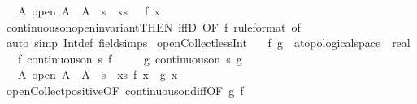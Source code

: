 \begin{isabellebody}
\ \ \ {\isachardoublequoteopen}{\isasymexists}A{\isachardot}{\kern0pt}\ open\ A\ {\isasymand}\ A\ {\isasyminter}\ s\ {\isacharequal}{\kern0pt}\ {\isacharbraceleft}{\kern0pt}x{\isasymin}s{\isachardot}{\kern0pt}\ {}\ {\isacharless}{\kern0pt}\ f\ x{\isacharbraceright}{\kern0pt}{\isachardoublequoteclose}\isanewline
%
\isadelimproof
\ \ %
\endisadelimproof
%
\isatagproof
{}\isamarkupfalse%
\ continuous{\isacharunderscore}{\kern0pt}on{\isacharunderscore}{\kern0pt}open{\isacharunderscore}{\kern0pt}invariant{\isacharbrackleft}{\kern0pt}THEN\ iffD{}{\isacharcomma}{\kern0pt}\ OF\ f{\isacharcomma}{\kern0pt}\ rule{\isacharunderscore}{\kern0pt}format{\isacharcomma}{\kern0pt}\ of\ {\isachardoublequoteopen}{\isacharbraceleft}{\kern0pt}{}\ {\isacharless}{\kern0pt}{\isachardot}{\kern0pt}{\isachardot}{\kern0pt}{\isacharbraceright}{\kern0pt}{\isachardoublequoteclose}{\isacharbrackright}{\kern0pt}\isanewline
\ \ \isamarkupfalse%
\ {\isacharparenleft}{\kern0pt}auto\ simp{\isacharcolon}{\kern0pt}\ Int{\isacharunderscore}{\kern0pt}def\ field{\isacharunderscore}{\kern0pt}simps{\isacharparenright}{\kern0pt}%
\endisatagproof
{\isafoldproof}%
%
\isadelimproof
\isanewline
%
\endisadelimproof
\isanewline
{}\isamarkupfalse%
\ open{\isacharunderscore}{\kern0pt}Collect{\isacharunderscore}{\kern0pt}less{\isacharunderscore}{\kern0pt}Int{\isacharcolon}{\kern0pt}\isanewline
\ \ \ f\ g\ {\isacharcolon}{\kern0pt}{\isacharcolon}{\kern0pt}\ {\isachardoublequoteopen}{\isacharprime}{\kern0pt}a{\isacharcolon}{\kern0pt}{\isacharcolon}{\kern0pt}topological{\isacharunderscore}{\kern0pt}space\ {\isasymRightarrow}\ real{\isachardoublequoteclose}\isanewline
\ \ \ f{\isacharcolon}{\kern0pt}\ {\isachardoublequoteopen}continuous{\isacharunderscore}{\kern0pt}on\ s\ f{\isachardoublequoteclose}\isanewline
\ \ \ \ \ g{\isacharcolon}{\kern0pt}\ {\isachardoublequoteopen}continuous{\isacharunderscore}{\kern0pt}on\ s\ g{\isachardoublequoteclose}\isanewline
\ \ \ {\isachardoublequoteopen}{\isasymexists}A{\isachardot}{\kern0pt}\ open\ A\ {\isasymand}\ A\ {\isasyminter}\ s\ {\isacharequal}{\kern0pt}\ {\isacharbraceleft}{\kern0pt}x{\isasymin}s{\isachardot}{\kern0pt}\ f\ x\ {\isacharless}{\kern0pt}\ g\ x{\isacharbraceright}{\kern0pt}{\isachardoublequoteclose}\isanewline
%
\isadelimproof
\ \ %
\endisadelimproof
%
\isatagproof
{}\isamarkupfalse%
\ open{\isacharunderscore}{\kern0pt}Collect{\isacharunderscore}{\kern0pt}positive{\isacharbrackleft}{\kern0pt}OF\ continuous{\isacharunderscore}{\kern0pt}on{\isacharunderscore}{\kern0pt}diff{\isacharbrackleft}{\kern0pt}OF\ g\ f{\isacharbrackright}{\kern0pt}{\isacharbrackright}{\kern0pt}\ \isamarkupfalse%

\end{isabellebody}
